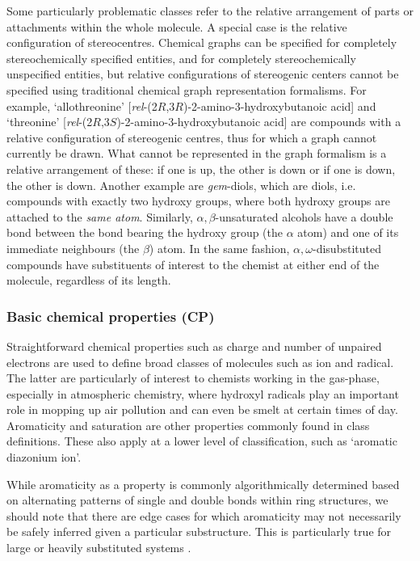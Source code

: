 \documentclass[10pt]{bmc_article}
\newenvironment{bmcformat}{\baselineskip20pt\sloppy\setboolean{publ}{false}}{\baselineskip20pt\sloppy}
\begin{document}
\begin{bmcformat}
Some particularly problematic classes refer to the relative arrangement of parts or attachments within the whole molecule. A special case is the relative configuration of stereocentres. Chemical graphs can be specified for completely stereochemically specified entities, and for completely stereochemically unspecified entities, but relative configurations of stereogenic centers cannot be specified using traditional chemical graph representation formalisms. For example, `allothreonine' [\textit{rel}-(2$R$,3$R$)-2-amino-3-hydroxybutanoic acid] and `threonine' [\textit{rel}-(2$R$,3$S$)-2-amino-3-hydroxybutanoic acid] are compounds with a relative configuration of stereogenic centres, thus for which a graph cannot currently be drawn. What cannot be represented in the graph formalism is a relative arrangement of these: if one is up, the other is down or if one is down, the other is down. Another example are 
\textit{gem}-diols, which are diols, i.e. compounds with exactly two hydroxy groups, where both hydroxy groups are attached to the \textit{same atom}.  Similarly, $\alpha,\beta$-unsaturated alcohols have a double bond between the bond bearing the hydroxy group (the $\alpha$ atom) and one of its immediate neighbours (the $\beta$) atom. In the same fashion, $\alpha,\omega$-disubstituted compounds have substituents of interest to the chemist at either end of the molecule, regardless of its length.


\subsubsection*{Basic chemical properties (CP)}

Straightforward chemical properties such as charge and number of unpaired electrons are used to define broad classes of molecules such as ion and radical. The latter are particularly of interest to chemists working in the gas-phase, especially in atmospheric chemistry, where hydroxyl radicals play an important role in mopping up air pollution and can even be smelt at certain times of day. Aromaticity and saturation are other properties commonly found in class definitions. These also apply at a lower level of classification, such as `aromatic diazonium ion'.  

While aromaticity as a property is commonly algorithmically determined based on alternating patterns of single and double bonds within ring structures, we should note that there are edge cases for which aromaticity may not necessarily be safely inferred given a particular substructure. This is particularly true for large or heavily substituted systems \cite{rzepa2006}. 



\end{bmcformat}
\end{document}
